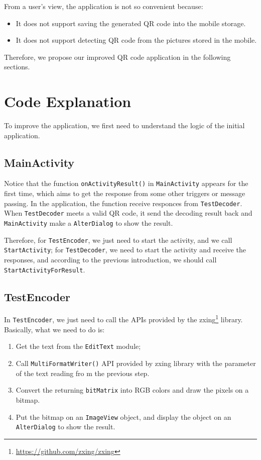 \documentclass[12pt, a4paper]{article}
\theoremstyle{definition}
\begin{document}
From a user's view, the application is not so convenient because:
\begin{itemize}
	\item It does not support saving the generated QR code into the mobile storage.
	\item It does not support detecting QR code from the pictures stored in the mobile.
\end{itemize}

Therefore, we propose our improved QR code application in the following sections.

\section{Code Explanation}
To improve the application, we first need to understand the logic of the initial application.

\subsection{MainActivity}
Notice that the function \texttt{onActivityResult()} in \texttt{MainActivity} appears for the first time, which aims to get the response from some other triggers or message passing. In the application, the function receive responces from \texttt{TestDecoder}. When  \texttt{TestDecoder} meets a valid QR code, it send the decoding result back and \texttt{MainActivity} make a \texttt{AlterDialog} to show the result.

Therefore, for \texttt{TestEncoder}, we just need to start the activity, and we call \texttt{StartActivity}; for \texttt{TestDecoder}, we need to start the activity and receive the responses, and according to the previous introduction, we should call \texttt{StartActivityForResult}.

\subsection{TestEncoder}
In \texttt{TestEncoder}, we just need to call the APIs provided by the zxing\footnote{\href{https://github.com/zxing/zxing}{https://github.com/zxing/zxing}} library. Basically, what we need to do is:
\begin{enumerate}
\item Get the text from the \texttt{EditText} module;
\item Call \texttt{MultiFormatWriter()} API provided by zxing library with the parameter of the text reading fro m the previous step.
\item Convert the returning \texttt{bitMatrix} into RGB colors and draw the pixels on a bitmap.
\item Put the bitmap on an \texttt{ImageView} object, and display the object on an \texttt{AlterDialog} to show the result.
\end{enumerate}
\end{document}
